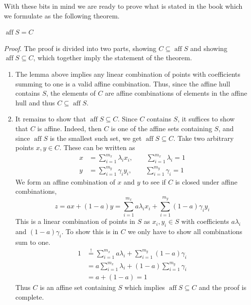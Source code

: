 With these bits in mind we are ready to prove what is stated in the book which we formulate as the following theorem.
\begin{Thm}
    $\operatorname{aff} S = C$
\end{Thm}
\textit{Proof}. The proof is divided into two parts, showing $C \subseteq \operatorname{aff} S$ and showing $\operatorname{aff} S \subseteq C$, which together imply the statement of the theorem.
\begin{enumerate}
    \item[Case $C \subseteq \operatorname{aff} S$: ] The lemma above implies any linear combination of points with coefficients summing to one is a valid affine combination. Thus, since the affine hull contains $S$, the elements of $C$ are affine combinations of elements in the affine hull and thus $C\subseteq \operatorname{aff}S$. 
    \item[Case $\operatorname{aff} S \subseteq C$] It remains to show that $\operatorname{aff} S \subseteq C$.
  Since $C$ contains $S$, it suffices to show that $C$ is affine. Indeed, then $C$ is one of the affine sets containing $S$, and since $\operatorname{aff} S$ is the smallest such set, we get $\operatorname{aff} S \subseteq C$.
    Take two arbitrary points $x, y \in C$. These can be written as
    \begin{align*}
        x &= \sum_{i = 1}^{m_x} \lambda_i x_i, \quad\quad \sum_{i = 1}^{m_x} \lambda_i = 1\\
        y &= \sum_{i = 1}^{m_y} \gamma_i y_i, \quad\quad \sum_{i = 1}^{m_y} \gamma_i = 1
    \end{align*}
    We form an affine combination of $x$ and $y$ to see if $C$ is closed under affine combinations,
    \[
        z = ax + (1 - a)y = \sum_{i = 1}^{m_x} a\lambda_i x_i + \sum_{i = 1}^{m_y} (1 - a) \gamma_i y_i 
    \]
    This is a linear combination of points in $S$ as $x_i, y_i \in S$ with coefficients $a\lambda_i$ and $(1-a)\gamma_i$.
    To show this is in $C$ we only have to show all combinations sum to one.
    \begin{align*}
        1 &\overset{!}{=} \sum_{i = 1}^{m_x}a\lambda_i + \sum_{i = 1}^{m_y}(1-a)\gamma_i \\
          &= a\sum_{i = 1}^{m_x}\lambda_i + (1 - a)\sum_{i = 1}^{m_y}\gamma_i\\
          &= a + (1-a) = 1
    \end{align*}
    Thus $C$ is an affine set containing $S$ which implies $\operatorname{aff} S \subseteq C$ and the proof is complete. \hfill\sq
\end{enumerate}

